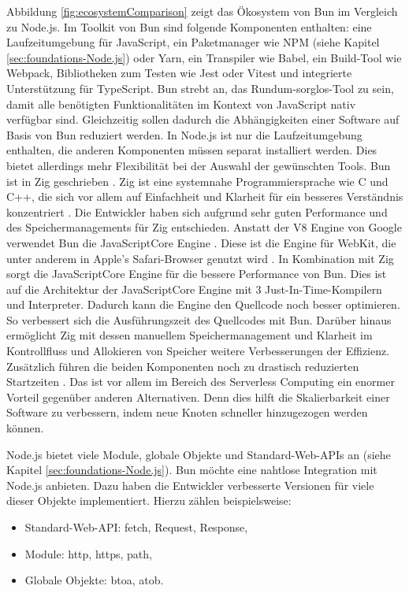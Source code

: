 \noindent
Abbildung \ref{fig:ecosystemComparison} zeigt das Ökosystem von Bun im Vergleich zu Node.js. Im Toolkit von Bun sind folgende Komponenten enthalten: eine Laufzeitumgebung für JavaScript, ein Paketmanager wie NPM (siehe Kapitel \ref{sec:foundations-Node.js}) oder Yarn, ein Transpiler wie Babel, ein Build-Tool wie Webpack, Bibliotheken zum Testen wie Jest oder Vitest und integrierte Unterstützung für TypeScript. \cite{Sumner.2023} Bun strebt an, das Rundum-sorglos-Tool zu sein, damit alle benötigten Funktionalitäten im Kontext von JavaScript nativ verfügbar sind. Gleichzeitig sollen dadurch die Abhängigkeiten einer Software auf Basis von Bun reduziert werden. \cite{Bun.} In Node.js ist nur die Laufzeitumgebung enthalten, die anderen Komponenten müssen separat installiert werden. \cite{Springer.2022} Dies bietet allerdings mehr Flexibilität bei der Auswahl der gewünschten Tools. \newline
Bun ist in Zig geschrieben \cite{Bun.}. Zig ist eine systemnahe Programmiersprache wie C und C++, die sich vor allem auf Einfachheit und Klarheit für ein besseres Verständnis konzentriert \cite{ZigSoftwareFoundation.o.J.}. Die Entwickler haben sich aufgrund sehr guten Performance und des Speichermanagements für Zig entschieden. Anstatt der V8 Engine von Google verwendet Bun die JavaScriptCore Engine \cite{Bun.}. Diese ist die Engine für WebKit, die unter anderem in Apple's Safari-Browser genutzt wird \cite{Apple.o.J.}. In Kombination mit Zig sorgt die JavaScriptCore Engine für die bessere Performance von Bun. Dies ist auf die Architektur der JavaScriptCore Engine mit 3 Just-In-Time-Kompilern und Interpreter. Dadurch kann die Engine den Quellcode noch besser optimieren. So verbessert sich die Ausführungszeit des Quellcodes mit Bun. \cite{Apple.o.J.b} Darüber hinaus ermöglicht Zig mit dessen manuellem Speichermanagement und Klarheit im Kontrollfluss und Allokieren von Speicher weitere Verbesserungen der Effizienz. \cite{Bun.} Zusätzlich führen die beiden Komponenten noch zu drastisch reduzierten Startzeiten \cite{Bun.}. Das ist vor allem im Bereich des Serverless Computing ein enormer Vorteil gegenüber anderen Alternativen. Denn dies hilft die Skalierbarkeit einer Software zu verbessern, indem neue Knoten schneller hinzugezogen werden können. \cite{Silva.2020} 

\noindent
Node.js bietet viele Module, globale Objekte und Standard-Web-APIs an (siehe Kapitel \ref{sec:foundations-Node.js}). Bun möchte eine nahtlose Integration mit Node.js anbieten. Dazu haben die Entwickler verbesserte Versionen für viele dieser Objekte implementiert. Hierzu zählen beispielsweise:
\begin{itemize}
	\item Standard-Web-API: fetch, Request, Response,
	\item Module: http, https, path,
	\item Globale Objekte: btoa, atob. \cite{Bun.} 
\end{itemize} 

